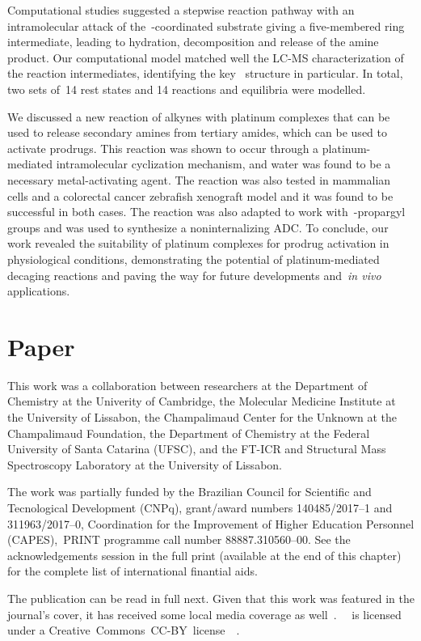 Computational studies suggested a stepwise reaction pathway with an intramolecular attack
of the~-coordinated substrate giving a five-membered ring intermediate,
leading to hydration,
decomposition and release of the amine product.
Our computational model matched well the LC-MS characterization of the reaction intermediates,
identifying the key~ structure in particular.
In total,
two sets of~14 rest states and 14 reactions and equilibria were modelled.

We discussed a new reaction of alkynes with platinum complexes that can be used to release secondary amines from tertiary amides,
which can be used to activate prodrugs.
This reaction was shown to occur through a platinum-mediated intramolecular cyclization mechanism,
and water was found to be a necessary metal-activating agent.
The reaction was also tested in mammalian cells and a colorectal cancer zebrafish xenograft model
and it was found to be successful in both cases.
The reaction was also adapted to work with~-propargyl groups and was used to synthesize a noninternalizing ADC.\@
To conclude,
our work revealed the suitability of platinum complexes for prodrug activation in physiological conditions,
demonstrating the potential of platinum-mediated decaging reactions
and paving the way for future developments and~\emph{in vivo} applications.

\section{Paper}

This work was a collaboration between researchers
at the Department of Chemistry at the Univerity of Cambridge,
the Molecular Medicine Institute at the University of Lissabon,
the Champalimaud Center for the Unknown at the Champalimaud Foundation,
the Department of Chemistry at the Federal University of Santa Catarina (UFSC),
and the FT-ICR and Structural Mass Spectroscopy Laboratory at the University of Lissabon.

The work was partially funded by the Brazilian Council for Scientific and Tecnological Development (CNPq),
grant/award numbers 140485/2017--1 and 311963/2017--0,
Coordination for the Improvement of Higher Education Personnel (CAPES),~PRINT programme call number 88887.310560--00.
See the acknowledgements session in the full print
(available at the end of this chapter)
for the complete list of international finantial aids.

The publication can be read in full next.
Given that this work was featured in the journal's cover,
it has received some local media coverage as well~\cite{noticias-da-ufsc2020}.~\citeauthor{Oliveira_2020}~\cite{Oliveira_2020}
is licensed under a
Creative~Commons~CC-BY~license~\ccby~\cite{ACS_CCBY_2014}.


